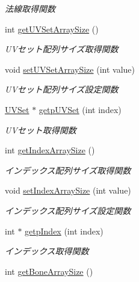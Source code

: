 \begin{DoxyCompactItemize}
\begin{DoxyCompactList}\small\item\em 法線取得関数 \end{DoxyCompactList}\item 
int \mbox{\hyperlink{class_md_bin_data_1_1_mesh_a37ce7e36969111ee324fa6c96a4aa8ca}{get\+U\+V\+Set\+Array\+Size}} ()
\begin{DoxyCompactList}\small\item\em U\+Vセット配列サイズ取得関数 \end{DoxyCompactList}\item 
void \mbox{\hyperlink{class_md_bin_data_1_1_mesh_a0d0af992c9ca6a314b1d3baf35d96e81}{set\+U\+V\+Set\+Array\+Size}} (int value)
\begin{DoxyCompactList}\small\item\em U\+Vセット配列サイズ設定関数 \end{DoxyCompactList}\item 
\mbox{\hyperlink{class_md_bin_data_1_1_mesh_1_1_u_v_set}{U\+V\+Set}} $\ast$ \mbox{\hyperlink{class_md_bin_data_1_1_mesh_af3ea3dc8ac955dc04bbc5af9112874cd}{getp\+U\+V\+Set}} (int index)
\begin{DoxyCompactList}\small\item\em U\+Vセット取得関数 \end{DoxyCompactList}\item 
int \mbox{\hyperlink{class_md_bin_data_1_1_mesh_ae8e5e348db511c353ffd8aaa89c906b3}{get\+Index\+Array\+Size}} ()
\begin{DoxyCompactList}\small\item\em インデックス配列サイズ取得関数 \end{DoxyCompactList}\item 
void \mbox{\hyperlink{class_md_bin_data_1_1_mesh_a122f9fe79f8a349697a87a3694d9969c}{set\+Index\+Array\+Size}} (int value)
\begin{DoxyCompactList}\small\item\em インデックス配列サイズ設定関数 \end{DoxyCompactList}\item 
int $\ast$ \mbox{\hyperlink{class_md_bin_data_1_1_mesh_a90d7c55722a43ed00410b18249278977}{getp\+Index}} (int index)
\begin{DoxyCompactList}\small\item\em インデックス取得関数 \end{DoxyCompactList}\item 
int \mbox{\hyperlink{class_md_bin_data_1_1_mesh_ae1dade2d63bbbdaf4125ec622f2ddbff}{get\+Bone\+Array\+Size}} ()

\end{DoxyCompactItemize}
